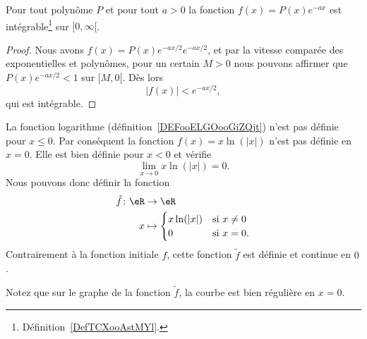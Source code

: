 \begin{proposition} \label{PropBQGBooHxNrrf}
	Pour tout polynôme \( P\) et pour tout \( a>0\) la fonction \( f(x)=P(x) e^{-ax}\) est intégrable\footnote{Définition~\ref{DefTCXooAstMYl}.} sur \( \mathopen[ 0 , \infty [\).
\end{proposition}

\begin{proof}
	Nous avons \( f(x)=P(x) e^{-ax/2} e^{-ax/2}\), et par la vitesse comparée des exponentielles et polynômes, pour un certain \( M>0\) nous pouvons affirmer que \( P(x) e^{-ax/2}<1\) sur \( \mathopen[ M , 0 [\). Dès lors
	\begin{equation}
		| f(x) |< e^{-ax/2},
	\end{equation}
	qui est intégrable.
\end{proof}

\begin{example}     \label{EXooAGEOooQdQkrS}
	La fonction logarithme (définition~\ref{DEFooELGOooGiZQjt}) n'est pas définie pour \( x\leq 0\). Par conséquent la fonction \( f(x)=x\ln(|x|)\) n'est pas définie en \( x=0\). Elle est bien définie pour \( x<0\) et vérifie
	\begin{equation}
		\lim_{x\to 0} x\ln(|x|)=0.
	\end{equation}
	Nous pouvons donc définir la fonction
	\begin{equation}
		\begin{aligned}
			\tilde f\colon \eR & \to \eR                             \\
			x                  & \mapsto \begin{cases}
				x\ln(| x |) & \text{si } x\neq 0 \\
				0           & \text{si } x=0.
			\end{cases}
		\end{aligned}
	\end{equation}
	Contrairement à la fonction initiale \( f\), cette fonction \( \tilde f\) est définie et continue en \( 0\).

	Notez que sur le graphe de la fonction \( \tilde f\), la courbe est bien régulière en \( x=0\).
	\begin{center}
		
	\end{center}
\end{example}


